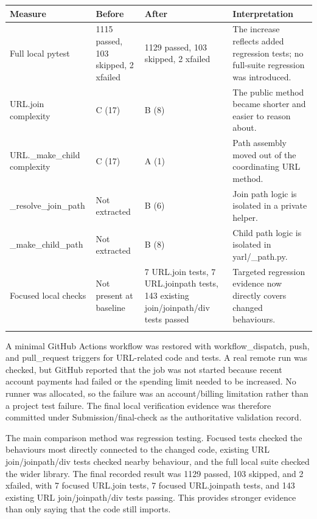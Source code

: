 \documentclass[11pt,a4paper]{article}
\begin{document}
\begin{longtable}{p{} p{} p{} p{}}
\toprule
Measure & Before & After & Interpretation \\
\midrule
Full local pytest & 1115 passed, 103 skipped, 2 xfailed & 1129 passed, 103 skipped, 2 xfailed & The increase reflects added regression tests; no full-suite regression was introduced. \\
\addlinespace
URL.join complexity & C (17) & B (8) & The public method became shorter and easier to reason about. \\
\addlinespace
URL.\_make\_child complexity & C (17) & A (1) & Path assembly moved out of the coordinating URL method. \\
\addlinespace
\_resolve\_join\_path & Not extracted & B (6) & Join path logic is isolated in a private helper. \\
\addlinespace
\_make\_child\_path & Not extracted & B (8) & Child path logic is isolated in yarl/\_path.py. \\
\addlinespace
Focused local checks & Not present at baseline & 7 URL.join tests, 7 URL.joinpath tests, 143 existing join/joinpath/div tests passed & Targeted regression evidence now directly covers changed behaviours. \\
\addlinespace
\bottomrule
\end{longtable}


A minimal GitHub Actions workflow was restored with workflow\_dispatch, push, and pull\_request triggers for URL-related code and tests. A real remote run was checked, but GitHub reported that the job was not started because recent account payments had failed or the spending limit needed to be increased. No runner was allocated, so the failure was an account/billing limitation rather than a project test failure. The final local verification evidence was therefore committed under Submission/final-check as the authoritative validation record.


The main comparison method was regression testing. Focused tests checked the behaviours most directly connected to the changed code, existing URL join/joinpath/div tests checked nearby behaviour, and the full local suite checked the wider library. The final recorded result was 1129 passed, 103 skipped, and 2 xfailed, with 7 focused URL.join tests, 7 focused URL.joinpath tests, and 143 existing URL join/joinpath/div tests passing. This provides stronger evidence than only saying that the code still imports.
\end{document}
